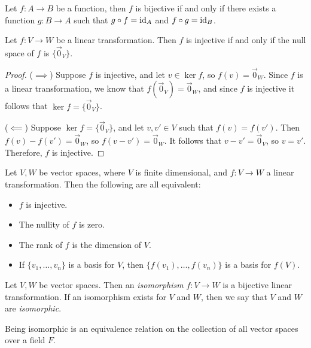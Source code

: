 \begin{thm}
    Let $f: A \to B$ be a function, then $f$ is bijective if and only if there exists a function $g: B \to A$ such that $g \circ f = \operatorname{id}_A$ and $f \circ g = \operatorname{id}_B$.
\end{thm}

\begin{lemma}
    Let $f: V \to W$ be a linear transformation. Then $f$ is injective if and only if the null space of $f$ is $\{\vec{0}_V\}$.
\end{lemma}

\begin{proof}\proofbreak
    ($\implies$) Suppose $f$ is injective, and let $v \in \ker f$, so $f(v) = \vec{0}_W$. Since $f$ is a linear transformation, we know that $f(\vec{0}_V) = \vec{0}_W$, and since $f$ is injective it follows that $\ker f = \{\vec{0}_V\}$.

    ($\impliedby$) Suppose $\ker f = \{\vec{0}_V\}$, and let $v, v' \in V$ such that $f(v) = f(v')$. Then $f(v) - f(v') = \vec{0}_W$, so $f(v - v') = \vec{0}_W$. It follows that $v - v' = \vec{0}_V$, so $v = v'$. Therefore, $f$ is injective.
\end{proof}

\begin{cor}\label{injective-nullity-rank}
    Let $V, W$ be vector spaces, where $V$ is finite dimensional, and $f: V \to W$ a linear transformation. Then the following are all equivalent:
    \begin{itemize}
        \item $f$ is injective.
        \item The nullity of $f$ is zero.
        \item The rank of $f$ is the dimension of $V$.
        \item If $\{v_1, \ldots, v_n\}$ is a basis for $V$, then $\{f(v_1), \ldots, f(v_n)\}$ is a basis for $f(V)$.
    \end{itemize}
\end{cor}

\begin{defn}
    Let $V, W$ be vector spaces. Then an \emph{isomorphism} $f: V \to W$ is a bijective linear transformation. If an isomorphism exists for $V$ and $W$, then we say that $V$ and $W$ are \emph{isomorphic}.
\end{defn}

\begin{rmk}
    Being isomorphic is an equivalence relation on the collection of all vector spaces over a field $F$.
\end{rmk}

